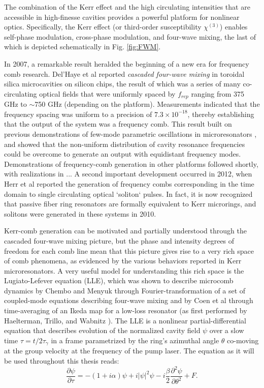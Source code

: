The combination of the Kerr effect and the high circulating intensities that are accessible in high-finesse cavities provides a powerful platform for nonlinear optics. Specifically, the Kerr effect (or third-order susceptibility $\chi^{(3)}$) enables self-phase modulation, cross-phase modulation, and four-wave mixing, the last of which is depicted schematically in Fig. \ref{fig:FWM}. 

In 2007, a remarkable result heralded the beginning of a new era for frequency comb research. Del'Haye et al reported \textit{cascaded four-wave mixing} in toroidal silica microcavities on silicon chips, the result of which was a series of many co-circulating optical fields that were uniformly spaced by $f_{rep}$ ranging from 375 GHz to $\sim$750 GHz (depending on the platform)\cite{DelHaye2007}. Measurements indicated that the frequency spacing was uniform to a precision of $7.3 \times 10^{-18}$, thereby establishing that the output of the system was a frequency comb. This result built on previous demonstrations of few-mode parametric oscillations in microresonators \cite{Kippenberg2004, Savchenkov2004,Agha2007}, and showed that the non-uniform distribution of cavity resonance frequencies could be overcome to generate an output with equidistant frequency modes. Demonstrations of frequency-comb generation in other platforms followed shortly, with realizations in ... A second important development occurred in 2012, when Herr et al reported the generation of frequency combs corresponding in the time domain to single circulating optical `soliton` pulses. In fact, it is now recognized that passive fiber ring resonators are formally equivalent to Kerr microrings, and solitons were generated in these systems in 2010. 

Kerr-comb generation can be motivated and partially understood through the cascaded four-wave mixing picture, but the phase and intensity degrees of freedom for each comb line mean that this picture gives rise to a very rich space of comb phenomena, as evidenced by the various behaviors reported in Kerr microresonators. A very useful model for understanding this rich space is the Lugiato-Lefever equation (LLE), which was shown to describe microcomb dynamics by Chembo and Menyuk \cite{Chembo2013} through Fourier-transformation of a set of coupled-mode equations describing four-wave mixing and by Coen et al \cite{Coen2013} through time-averaging of an Ikeda map for a low-loss resonator (as first performed by Haelterman, Trillo, and Wabnitz \cite{Haelterman1992}).  The LLE is a nonlinear partial-differential equation that describes evolution of the normalized cavity field $\psi$ over a slow time $\tau=t/2\tau_\gamma$ in a frame parametrized by the ring's azimuthal angle $\theta$ co-moving at the group velocity at the frequency of the pump laser. The equation as it will be used throughout this thesis reads:
\begin{equation}
\frac{\partial \psi}{\partial \tau}=-(1+i \alpha) \psi + i|\psi|^2 \psi -i \frac{\beta}{2} \frac{\partial^2 \psi}{\partial \theta^2} +F.
\end{equation}

